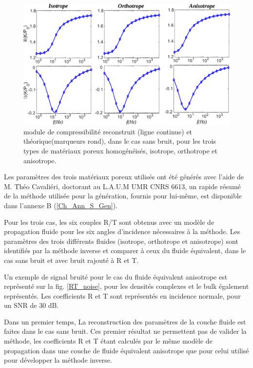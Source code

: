 \documentclass[twoside,openright]{report}
\begin{document}
    \begin{figure}[ht!]
        \centering
        \includegraphics[scale=0.45]{Bulk.pdf}
        \caption{module de compressibilité reconstruit (ligne continue) et théorique(marqueurs rond), dans le cas sans bruit, pour les trois types de matériaux poreux homogénéisés, isotrope, orthotrope et anisotrope.}
        \label{bulk}
    \end{figure}
    
    Les paramètres des trois matériaux poreux utilisés ont été générés avec l'aide de M. Théo Cavaliéri, doctorant au L.A.U.M UMR CNRS 6613, un rapide résumé de la méthode utilisée pour la génération, fournis pour lui-même, est disponible dans l'annexe B (\ref{Ch_Ann_S_Gen}). 
    
    Pour les trois cas, les six couples R/T sont obtenus avec un modèle de propagation fluide pour les six angles d'incidence nécessaires à la méthode. Les paramètres des trois différents fluides (isotrope, orthotrope et anisotrope) sont identifiés par la méthode inverse et comparer à ceux du fluide équivalent, dans le cas sans bruit et avec bruit rajouté à R et T. 
    
    Un exemple de signal bruité pour le cas du fluide équivalent anisotrope est représenté sur la fig. \ref{RT_noise}, pour les densités complexes et le bulk également représentés. Les coefficients R et T sont représentés en incidence normale, pour un SNR de 30 dB.  
    
    Dans un premier temps, La reconstruction des paramètres de la couche fluide  est faites dans le cas sans bruit. Ces premier résultat ne permettent pas de valider la méthode, les coefficients R et T étant calculés par le même modèle de propagation dans une couche de fluide équivalent anisotrope que pour celui utilisé pour développer la méthode inverse.  
\end{document}
